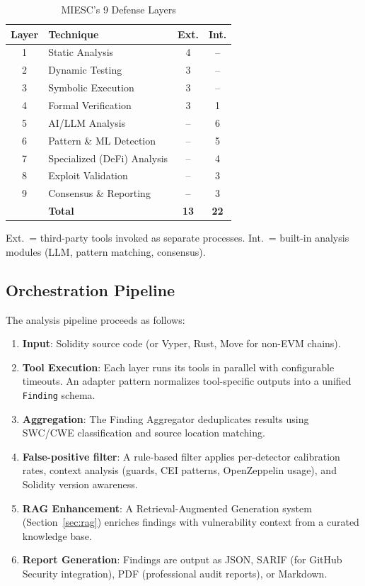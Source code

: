 \documentclass[conference]{IEEEtran}
\begin{document}
\begin{table}[htbp]
\caption{MIESC's 9 Defense Layers}
\label{tab:layers}
\centering
\begin{tabular}{@{}clcc@{}}
\toprule
\textbf{Layer} & \textbf{Technique} & \textbf{Ext.} & \textbf{Int.} \\
\midrule
1 & Static Analysis & 4 & -- \\
2 & Dynamic Testing & 3 & -- \\
3 & Symbolic Execution & 3 & -- \\
4 & Formal Verification & 3 & 1 \\
5 & AI/LLM Analysis & -- & 6 \\
6 & Pattern \& ML Detection & -- & 5 \\
7 & Specialized (DeFi) Analysis & -- & 4 \\
8 & Exploit Validation & -- & 3 \\
9 & Consensus \& Reporting & -- & 3 \\
\midrule
  & \textbf{Total} & \textbf{13} & \textbf{22} \\
\bottomrule
\end{tabular}
\footnotesize{Ext.\ = third-party tools invoked as separate processes. Int.\ = built-in analysis modules (LLM, pattern matching, consensus).}
\end{table}

\subsection{Orchestration Pipeline}

The analysis pipeline proceeds as follows:

\begin{enumerate}
    \item \textbf{Input}: Solidity source code (or Vyper, Rust, Move for non-EVM chains).
    \item \textbf{Tool Execution}: Each layer runs its tools in parallel with configurable timeouts. An adapter pattern normalizes tool-specific outputs into a unified \texttt{Finding} schema.
    \item \textbf{Aggregation}: The Finding Aggregator deduplicates results using SWC/CWE classification and source location matching.
    \item \textbf{False-positive filter}: A rule-based filter applies per-detector calibration rates, context analysis (guards, CEI patterns, OpenZeppelin usage), and Solidity version awareness.
    \item \textbf{RAG Enhancement}: A Retrieval-Augmented Generation system (Section~\ref{sec:rag}) enriches findings with vulnerability context from a curated knowledge base.
    \item \textbf{Report Generation}: Findings are output as JSON, SARIF (for GitHub Security integration), PDF (professional audit reports), or Markdown.
\end{enumerate}
\end{document}
